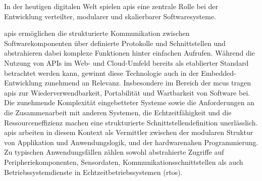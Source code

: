 In der heutigen digitalen Welt spielen \gls{api}s eine zentrale Rolle bei der Entwicklung verteilter, modularer und skalierbarer Softwaresysteme. 

\gls{api}s ermöglichen die strukturierte Kommunikation zwischen Softwarekomponenten über definierte Protokolle und Schnittstellen und abstrahieren dabei komplexe Funktionen hinter einfachen Aufrufen.
Während die Nutzung von APIs im Web- und Cloud-Umfeld bereits als etablierter Standard betrachtet werden kann, gewinnt diese Technologie auch in der Embedded-Entwicklung zunehmend an Relevanz.
Insbesondere im Bereich der \gls{mcu}s tragen \gls{api}s zur Wiederverwendbarkeit, Portabilität und Wartbarkeit von Software bei.
Die zunehmende Komplexität eingebetteter Systeme sowie die Anforderungen an die Zusammenarbeit mit anderen Systemen, die Echtzeitfähigkeit und  die Ressourceneffizienz machen eine strukturierte Schnittstellendefinition unerlässlich.
\gls{api}s arbeiten in diesem Kontext als Vermittler zwischen der modularen Struktur von Applikation und Anwendungslogik, und der hardwarenahen Programmierung.
Zu typischen Anwendungsfällen zählen sowohl abstrahierte Zugriffe auf Peripheriekomponenten, Sensordaten, Kommunikationsschnittstellen als auch Betriebssystemdienste in Echtzeitbetriebssystemen (\gls{rtos}).